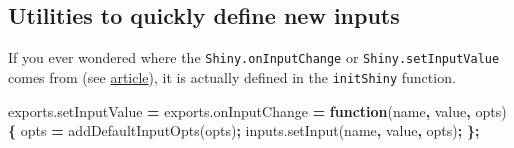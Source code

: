 \documentclass[]{book}
\newenvironment{Shaded}{\begin{snugshade}}{\end{snugshade}}
\newcommand{\AttributeTok}[1]{\textcolor[rgb]{0.77,0.63,0.00}{#1}}
\newcommand{\ControlFlowTok}[1]{\textcolor[rgb]{0.13,0.29,0.53}{\textbf{#1}}}
\newcommand{\DecValTok}[1]{\textcolor[rgb]{0.00,0.00,0.81}{#1}}
\newcommand{\KeywordTok}[1]{\textcolor[rgb]{0.13,0.29,0.53}{\textbf{#1}}}
\newcommand{\NormalTok}[1]{#1}
\newcommand{\OperatorTok}[1]{\textcolor[rgb]{0.81,0.36,0.00}{\textbf{#1}}}
\newcommand{\StringTok}[1]{\textcolor[rgb]{0.31,0.60,0.02}{#1}}
\newcommand{\VariableTok}[1]{\textcolor[rgb]{0.00,0.00,0.00}{#1}}
\begin{document}
\begin{Shaded}
\end{Shaded}

\hypertarget{utilities-to-quickly-define-new-inputs}{%
\subsection{Utilities to quickly define new inputs}\label{utilities-to-quickly-define-new-inputs}}

If you ever wondered where the \texttt{Shiny.onInputChange} or \texttt{Shiny.setInputValue} comes from (see \href{https://shiny.rstudio.com/articles/communicating-with-js.html}{article}), it is actually defined in the \texttt{initShiny} function.

\begin{Shaded}
\begin{Highlighting}[]
\VariableTok{exports}\NormalTok{.}\AttributeTok{setInputValue} \OperatorTok{=} \VariableTok{exports}\NormalTok{.}\AttributeTok{onInputChange} \OperatorTok{=} \KeywordTok{function}\NormalTok{(name}\OperatorTok{,}\NormalTok{ value}\OperatorTok{,}\NormalTok{ opts) }\OperatorTok{\{}
\NormalTok{opts }\OperatorTok{=} \AttributeTok{addDefaultInputOpts}\NormalTok{(opts)}\OperatorTok{;}
\VariableTok{inputs}\NormalTok{.}\AttributeTok{setInput}\NormalTok{(name}\OperatorTok{,}\NormalTok{ value}\OperatorTok{,}\NormalTok{ opts)}\OperatorTok{;}
\OperatorTok{\};}
\end{Highlighting}
\end{Shaded}
\end{document}
